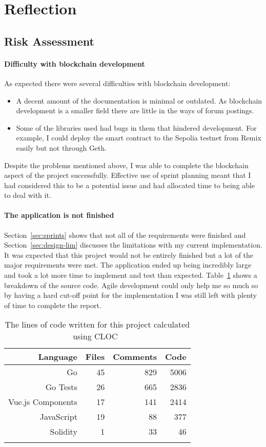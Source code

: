 \section{Reflection}

\subsection*{Risk Assessment}

\paragraph*{Difficulty with blockchain development}
As expected there were several difficulties with blockchain development:

\begin{itemize}
  \item A decent amount of the documentation is minimal or outdated. As blockchain development is a smaller field there are little in the ways of forum postings.
  \item Some of the libraries used had bugs in them that hindered development. For example, I could deploy the smart contract to the Sepolia testnet from Remix easily but not through Geth. 
\end{itemize}

\newparagraph
Despite the problems mentioned above, I was able to complete the blockchain aspect of the project successfully. Effective use of sprint planning meant that I had considered this to be a potential issue and had allocated time to being able to deal with it.

\paragraph*{The application is not finished}
Section~\ref{sec:sprints} shows that not all of the requirements were finished and Section~\ref{sec:design-lim} discusses the limitations with my current implementation. It was expected that this project would not be entirely finished but a lot of the major requirements were met.
\x
The application ended up being incredibly large and took a lot more time to implement and test than expected. Table~\ref{tab:cloc} shows a breakdown of the source code. Agile development could only help me so much so by having a hard cut-off point for the implementation I was still left with plenty of time to complete the report.

\begin{longtable}{ r r r r }
  \toprule
  \textbf{Language} & \textbf{Files} & \textbf{Comments} & \textbf{Code}
  \\\midrule\midrule
  Go
  & 45
  & 829
  & 5006
  \\
  Go Tests
  & 26
  & 665
  & 2836
  \\
  Vue.js Components
  & 17
  & 141
  & 2414
  \\
  JavaScript
  & 19
  & 88
  & 377
  \\
  Solidity
  & 1
  & 33
  & 46
  \\\bottomrule\bottomrule
  \caption{The lines of code written for this project calculated using CLOC~\cite{noauthor_aldanialcloc_nodate}}
  \label{tab:cloc}
\end{longtable}

